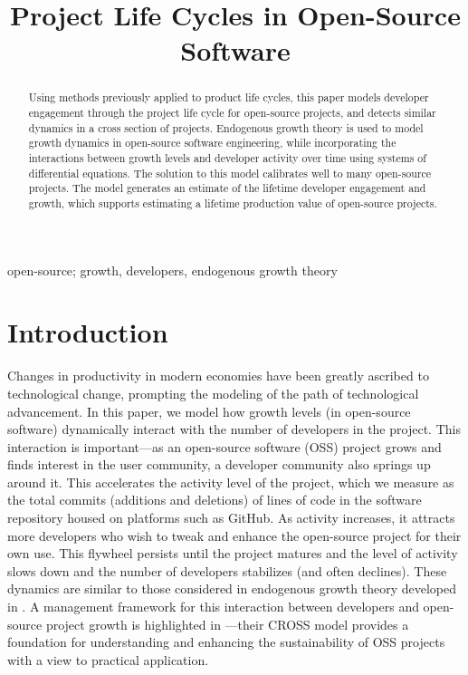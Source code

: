 \documentclass[conference]{IEEEtran}
\begin{document}
\title{Project Life Cycles in Open-Source Software}

\author{
}


\maketitle

\begin{abstract}

Using methods previously applied to product life cycles, this paper models developer engagement through the project life cycle for open-source projects, and detects similar dynamics in a cross section of projects. Endogenous growth theory is used to model growth dynamics in open-source software engineering, while incorporating the interactions between growth levels and developer activity over time using  systems of differential equations. The solution to this model calibrates well to many open-source projects. The model generates an estimate of the lifetime developer engagement and growth, which supports estimating a lifetime production value of open-source projects. 

\end{abstract}

\begin{IEEEkeywords}
open-source; growth, developers, endogenous growth theory
\end{IEEEkeywords}

\section{Introduction}

Changes in productivity in modern economies have been greatly ascribed to technological change, prompting the modeling of the path of technological advancement. In this paper, we model how growth levels (in open-source software) dynamically interact with the number of developers in the project. This interaction is important---as an open-source software (OSS) project grows and finds interest in the user community, a developer community also springs up around it. This accelerates the activity level of the project, which we measure as the total commits (additions and deletions) of lines of code in the software repository housed on platforms such as GitHub. As activity increases, it attracts more developers who wish to tweak and enhance the open-source project for their own use. This flywheel persists until the project matures and the level of activity slows down and the number of developers stabilizes (and often declines). These dynamics are similar to those considered in endogenous growth theory developed in \cite{romer_endogenous_1990}. A management framework for this interaction between developers and open-source project growth is highlighted in \cite{dey_cross_2024}---their CROSS model provides a foundation for understanding and enhancing the sustainability of OSS projects with a view to  practical application.
\end{document}
